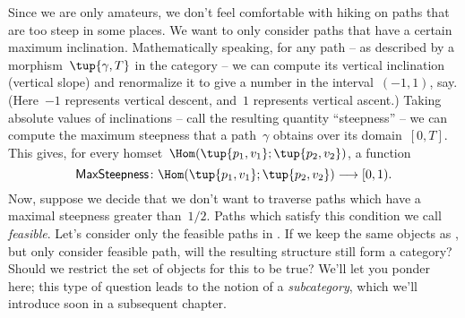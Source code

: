 Since we are only amateurs, we don't feel comfortable with hiking on paths that are too steep in some places. We want to only consider paths that have a certain maximum inclination. Mathematically speaking, for any path -- as described by a morphism~$\tup{\gamma, T}$ in the category \Berg -- we can compute its vertical inclination (vertical slope) and renormalize it to give a number in the interval~$(-1, 1)$, say. (Here~$-1$ represents vertical descent, and~$1$ represents vertical ascent.) Taking absolute values of inclinations -- call the resulting quantity ``steepness'' -- we can compute the maximum steepness that a path~$\gamma$ obtains over its domain~$[0,T]$. This gives, for every homset~$\Hom(\tup{p_1, v_1}; \tup{p_2, v_2})$, a function
\begin{equation*}
  \mathsf{MaxSteepness}\colon \Hom(\tup{p_1, v_1}; \tup{p_2, v_2}) \longrightarrow [0, 1).
\end{equation*}
Now, suppose we decide that we don't want to traverse paths which have a maximal steepness greater than~$1/2$. Paths which satisfy this condition we call \emph{feasible}. Let's consider only the feasible paths in \Berg. If we keep the same objects as \Berg, but only consider feasible path, will the resulting structure still form a category? Should we restrict the set of objects for this to be true? We'll let you ponder here; this type of question leads to the notion of a \emph{subcategory}, which we'll introduce soon in a subsequent chapter.


